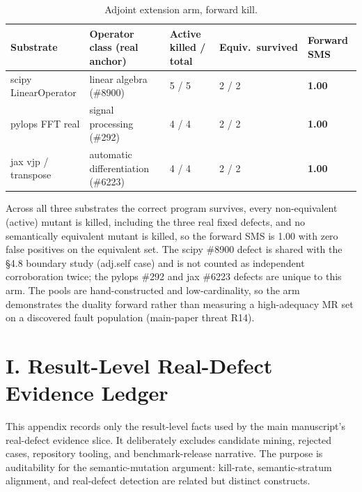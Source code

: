 \documentclass[acmsmall,screen,review]{acmart}
\begin{document}
{\def\LTcaptype{table} %
\begin{longtable}[]{@{}p{2.0cm}p{3.2cm}p{2.5cm}p{1.8cm}p{1.8cm}@{}}
\caption{Adjoint extension arm, forward kill.}\label{tab:suppl-adjoint}\\
\toprule\noalign{}
Substrate & Operator class (real anchor) & Active killed / total & Equiv.\ survived & Forward SMS \\
\midrule\noalign{}
\endfirsthead
\endhead
\bottomrule\noalign{}
\endlastfoot
scipy LinearOperator & linear algebra (\#8900) & 5 / 5 & 2 / 2 & \textbf{1.00} \\
pylops FFT real & signal processing (\#292) & 4 / 4 & 2 / 2 & \textbf{1.00} \\
jax vjp / transpose & automatic differentiation (\#6223) & 4 / 4 & 2 / 2 & \textbf{1.00} \\
\end{longtable}
}

Across all three substrates the correct program survives, every
non-equivalent (active) mutant is killed, including the three real
fixed defects, and no semantically equivalent mutant is killed, so the
forward SMS is 1.00 with zero false positives on the equivalent set. The
scipy \#8900 defect is shared with the §4.8 boundary study (adj.self case)
and is not counted as independent corroboration twice; the pylops \#292
and jax \#6223 defects are unique to this arm. The pools are
hand-constructed and low-cardinality, so the arm demonstrates the duality
forward rather than measuring a high-adequacy MR set on a discovered fault
population (main-paper threat R14).

\section{I. Result-Level Real-Defect Evidence Ledger}\label{i.-result-level-real-defect-evidence-ledger}

This appendix records only the result-level facts used by the main
manuscript's real-defect evidence slice. It deliberately excludes
candidate mining, rejected cases, repository tooling, and benchmark-release
narrative. The purpose is auditability for the semantic-mutation argument:
kill-rate, semantic-stratum alignment, and real-defect detection are related
but distinct constructs.
\end{document}
